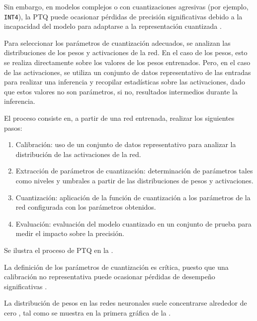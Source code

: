 Sin embargo, en modelos complejos o con cuantizaciones agresivas (por ejemplo, \texttt{INT4}), la PTQ puede ocasionar pérdidas de precisión significativas debido a la incapacidad del modelo para adaptarse a la representación cuantizada \cite{dai2024trainablefixedpointquantizationdeep}.

Para seleccionar los parámetros de cuantización adecuados, se analizan las distribuciones de los pesos y activaciones de la red. En el caso de los pesos, esto se realiza directamente sobre los valores de los pesos entrenados. Pero, en el caso de las activaciones, se utiliza un conjunto de datos representativo de las entradas para realizar una inferencia y recopilar estadísticas sobre las activaciones, dado que estos valores no son parámetros, si no, resultados intermedios durante la inferencia.

El proceso consiste en, a partir de una red entrenada, realizar los siguientes pasos:

\begin{enumerate}
    \item Calibración: uso de un conjunto de datos representativo para analizar la distribución de las activaciones de la red.
    \item Extracción de parámetros de cuantización: determinación de parámetros tales como niveles y umbrales a partir de las distribuciones de pesos y activaciones.
    \item Cuantización: aplicación de la función de cuantización a los parámetros de la red configurada con los parámetros obtenidos.
    \item Evaluación: evaluación del modelo cuantizado en un conjunto de prueba para medir el impacto sobre la precisión.
\end{enumerate}

Se ilustra el proceso de PTQ en la .


La definición de los parámetros de cuantización es crítica, puesto que una calibración no representativa puede ocasionar pérdidas de desempeño significativas \cite{Nagel2020}.

La distribución de pesos en las redes neuronales suele concentrarse alrededor de cero \cite{Krishnamoorthi2018}, tal como se muestra en la primera gráfica de la .

